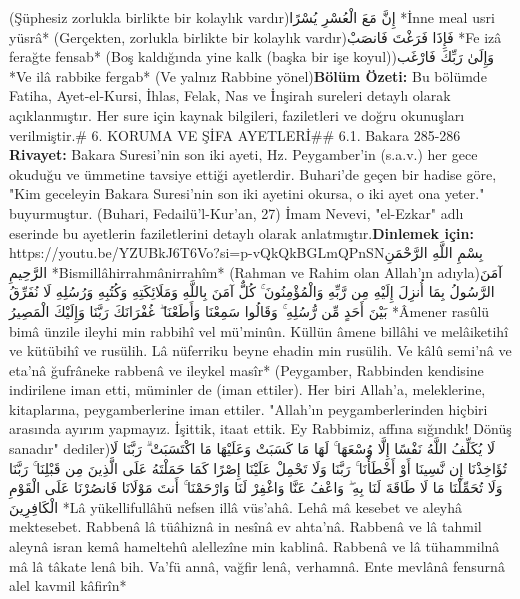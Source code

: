 \documentclass[12pt,a4paper]{article}
\begin{document}
{(Şüphesiz zorlukla birlikte bir kolaylık vardır)إِنَّ مَعَ الْعُسْرِ يُسْرًا
*İnne meal usri yüsrâ*
(Gerçekten, zorlukla birlikte bir kolaylık vardır)فَإِذَا فَرَغْتَ فَانصَبْ
*Fe izâ ferağte fensab*
(Boş kaldığında yine kalk (başka bir işe koyul))وَإِلَىٰ رَبِّكَ فَارْغَب
*Ve ilâ rabbike fergab*
(Ve yalnız Rabbine yönel)\textbf{Bölüm Özeti:}
Bu bölümde Fatiha, Ayet-el-Kursi, İhlas, Felak, Nas ve İnşirah sureleri detaylı olarak açıklanmıştır. Her sure için kaynak bilgileri, faziletleri ve doğru okunuşları verilmiştir.\# 6. KORUMA VE ŞİFA AYETLERİ\#\# 6.1. Bakara 285-286
\textbf{Rivayet:} Bakara Suresi'nin son iki ayeti, Hz. Peygamber'in (s.a.v.) her gece okuduğu ve ümmetine tavsiye ettiği ayetlerdir. Buhari'de geçen bir hadise göre, "Kim geceleyin Bakara Suresi'nin son iki ayetini okursa, o iki ayet ona yeter." buyurmuştur. (Buhari, Fedailü'l-Kur'an, 27) İmam Nevevi, "el-Ezkar" adlı eserinde bu ayetlerin faziletlerini detaylı olarak anlatmıştır.\textbf{Dinlemek için:} https://youtu.be/YZUBkJ6T6Vo?si=p-vQkQkBGLmQPnSNبِسْمِ اللَّهِ الرَّحْمَنِ الرَّحِيمِ
*Bismillâhirrahmânirrahîm*
(Rahman ve Rahim olan Allah'ın adıyla)آمَنَ الرَّسُولُ بِمَا أُنزِلَ إِلَيْهِ مِن رَّبِّهِ وَالْمُؤْمِنُونَ ۚ كُلٌّ آمَنَ بِاللَّهِ وَمَلَائِكَتِهِ وَكُتُبِهِ وَرُسُلِهِ لَا نُفَرِّقُ بَيْنَ أَحَدٍ مِّن رُّسُلِهِ ۚ وَقَالُوا سَمِعْنَا وَأَطَعْنَا ۖ غُفْرَانَكَ رَبَّنَا وَإِلَيْكَ الْمَصِيرُ
*Âmener rasûlü bimâ ünzile ileyhi min rabbihî vel mü'minûn. Küllün âmene billâhi ve melâiketihî ve kütübihî ve rusülih. Lâ nüferriku beyne ehadin min rusülih. Ve kâlû semi'nâ ve eta'nâ ğufrâneke rabbenâ ve ileykel masîr*
(Peygamber, Rabbinden kendisine indirilene iman etti, müminler de (iman ettiler). Her biri Allah'a, meleklerine, kitaplarına, peygamberlerine iman ettiler. "Allah'ın peygamberlerinden hiçbiri arasında ayırım yapmayız. İşittik, itaat ettik. Ey Rabbimiz, affına sığındık! Dönüş sanadır" dediler)لَا يُكَلِّفُ اللَّهُ نَفْسًا إِلَّا وُسْعَهَا ۚ لَهَا مَا كَسَبَتْ وَعَلَيْهَا مَا اكْتَسَبَتْ ۗ رَبَّنَا لَا تُؤَاخِذْنَا إِن نَّسِينَا أَوْ أَخْطَأْنَا ۚ رَبَّنَا وَلَا تَحْمِلْ عَلَيْنَا إِصْرًا كَمَا حَمَلْتَهُ عَلَى الَّذِينَ مِن قَبْلِنَا ۚ رَبَّنَا وَلَا تُحَمِّلْنَا مَا لَا طَاقَةَ لَنَا بِهِ ۖ وَاعْفُ عَنَّا وَاغْفِرْ لَنَا وَارْحَمْنَا ۚ أَنتَ مَوْلَانَا فَانصُرْنَا عَلَى الْقَوْمِ الْكَافِرِينَ
*Lâ yükellifullâhü nefsen illâ vüs'ahâ. Lehâ mâ kesebet ve aleyhâ mektesebet. Rabbenâ lâ tüâhiznâ in nesînâ ev ahta'nâ. Rabbenâ ve lâ tahmil aleynâ isran kemâ hameltehû alellezîne min kablinâ. Rabbenâ ve lâ tühammilnâ mâ lâ tâkate lenâ bih. Va'fü annâ, vağfir lenâ, verhamnâ. Ente mevlânâ fensurnâ alel kavmil kâfirîn*
}
\end{document}
